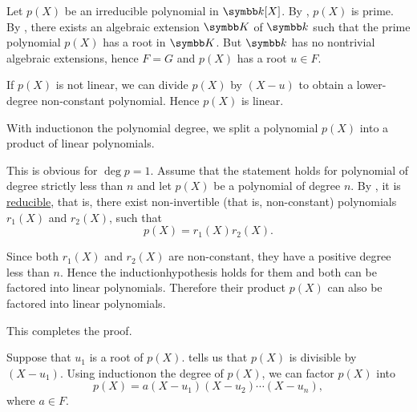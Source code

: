 \begin{RefListProof}
     Let \( p(X) \) be an irreducible polynomial in \( \Bk[X] \). By , \( p(X) \) is prime. By , there exists an algebraic extension \( \BK \) of \( \Bk \) such that the prime polynomial \( p(X) \) has a root in \( \BK \). But \( \Bk \) has no nontrivial algebraic extensions, hence \( F = G \) and \( p(X) \) has a root \( u \in F \).

    If \( p(X) \) is not linear\LEM, we can divide \( p(X) \) by \( (X - u) \) to obtain a lower-degree non-constant polynomial. Hence \( p(X) \) is linear.

     With induction\IND on the polynomial degree, we split a polynomial \( p(X) \) into a product of linear polynomials.

    This is obvious for \( \deg p = 1 \). Assume that the statement holds for polynomial of degree strictly less than \( n \) and let \( p(X) \) be a polynomial of degree \( n \). By , it is \hyperref[def:irreducible_ring_element]{reducible}, that is, there exist non-invertible (that is, non-constant) polynomials \( r_1(X) \) and \( r_2(X) \), such that
    \begin{equation*}
      p(X) = r_1(X) r_2(X).
    \end{equation*}

    Since both \( r_1(X) \) and \( r_2(X) \) are non-constant, they have a positive degree less than \( n \). Hence the induction\IND hypothesis holds for them and both can be factored into linear polynomials. Therefore their product \( p(X) \) can also be factored into linear polynomials.

    This completes the proof.

     Suppose that \( u_1 \) is a root of \( p(X) \).  tells us that \( p(X) \) is divisible by \( (X - u_1) \). Using induction\IND on the degree of \( p(X) \), we can factor \( p(X) \) into
    \begin{equation*}
      p(X) = a (X - u_1) (X - u_2) \cdots (X - u_n),
    \end{equation*}
    where \( a \in F \).


\end{RefListProof}
